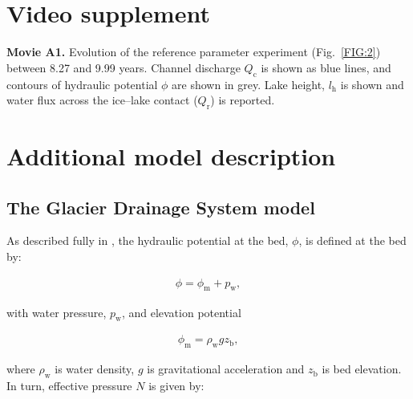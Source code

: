 \documentclass[tc, manuscript]{copernicus}
\providecommand{\DIFdelbegin}{} %
\begin{document}
\DIFdelbegin %


\appendix
\section{Video supplement}
\textbf{Movie A1.} Evolution of the reference parameter experiment (Fig.~\ref{FIG:2}) between 8.27 and 9.99 years. Channel discharge $Q_{\mathrm{c}}$ is shown as blue lines, and contours of hydraulic potential $\phi$ are shown in grey. Lake height, $l_{\mathrm{h}}$ is shown and water flux across the ice--lake contact ($Q_{\mathrm{r}}$) is reported. \label{Apfig:SuppMovie}


\section{Additional model description}\label{Appendix:MODEL}



\subsection{The Glacier Drainage System model}\label{Appendix:GlaDS}

As described fully in \citet{werder2013modeling}, the hydraulic potential at the bed, $\phi$, is defined at the bed by: 

\begin{equation}
\label{appeq:GlaDSdirBC}
\begin{aligned}
\phi = \phi_{\mathrm{m}} + p_{\mathrm{w}},
\end{aligned}
\end{equation}

with water pressure, $p_{\mathrm{w}}$, and elevation potential

\begin{equation}
\label{eq:elevationpotential}
\begin{aligned}
\phi_{\mathrm{m}} = \rho_{\mathrm{w}}gz_{\mathrm{b}},
\end{aligned}
\end{equation}

where $\rho_{\mathrm{w}}$ is water density, $g$ is gravitational acceleration and $z_{\mathrm{b}}$ is bed elevation. In turn, effective pressure $N$ is given by: 
\end{document}
